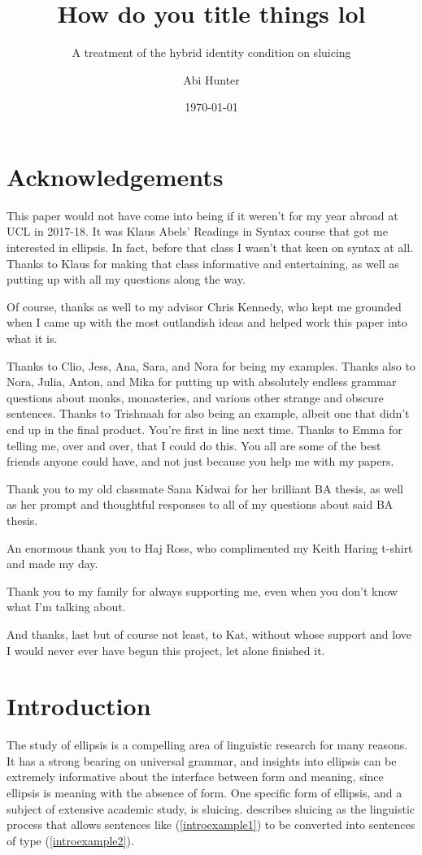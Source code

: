 \documentclass{turabian-researchpaper}
\title{How do you title things lol}
\subtitle{A treatment of the hybrid identity condition on sluicing}
\author{Abi Hunter}
\date{\today}
\begin{document}
\maketitle

\section*{Acknowledgements}
This paper would not have come into being if it weren't for my year abroad at UCL in 2017-18. It was Klaus Abels' Readings in Syntax course that got me interested in ellipsis. In fact, before that class I wasn't that keen on syntax at all. Thanks to Klaus for making that class informative and entertaining, as well as putting up with all my questions along the way. 

Of course, thanks as well to my advisor Chris Kennedy, who kept me grounded when I came up with the most outlandish ideas and helped work this paper into what it is. 

Thanks to Clio, Jess, Ana, Sara, and Nora for being my examples. Thanks also to Nora, Julia, Anton, and Mika for putting up with absolutely endless grammar questions about monks, monasteries, and various other strange and obscure sentences. Thanks to Trishnaah for also being an example, albeit one that didn't end up in the final product. You're first in line next time. Thanks to Emma for telling me, over and over, that I could do this. You all are some of the best friends anyone could have, and not just because you help me with my papers. 

Thank you to my old classmate Sana Kidwai for her brilliant BA thesis, as well as her prompt and thoughtful responses to all of my questions about said BA thesis. 

An enormous thank you to Haj Ross, who complimented my Keith Haring t-shirt and made my day. 

Thank you to my family for always supporting me, even when you don't know what I'm talking about. 

And thanks, last but of course not least, to Kat, without whose support and love I would never ever have begun this project, let alone finished it.

\clearpage

\section{Introduction}

The study of ellipsis is a compelling area of linguistic research for many reasons. It has a strong bearing on universal grammar, and insights into ellipsis can be extremely informative about the interface between form and meaning, since ellipsis is meaning with the absence of form. One specific form of ellipsis, and a subject of extensive academic study, is sluicing. \citet{rossguesswho} describes sluicing as the linguistic process that allows sentences like (\ref{introexample1}) to be converted into sentences of type (\ref{introexample2}). 
\end{document}
